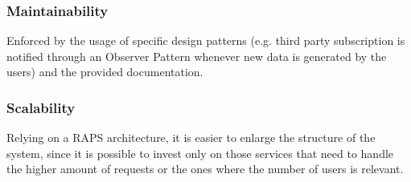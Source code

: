 \documentclass[12pt,a4paper]{article}
\begin{document}
	\subsubsection{Maintainability}
	Enforced by the usage of specific design patterns (e.g. third party subscription is notified through an Observer Pattern whenever new data is generated by the users) and the provided documentation.
	\subsubsection{Scalability}
	Relying on a RAPS architecture, it is easier to enlarge the structure of the system, since it is possible to invest only on those services that need to handle the higher amount of requests or the ones where the number of users is relevant.


	\newpage
\end{document}
